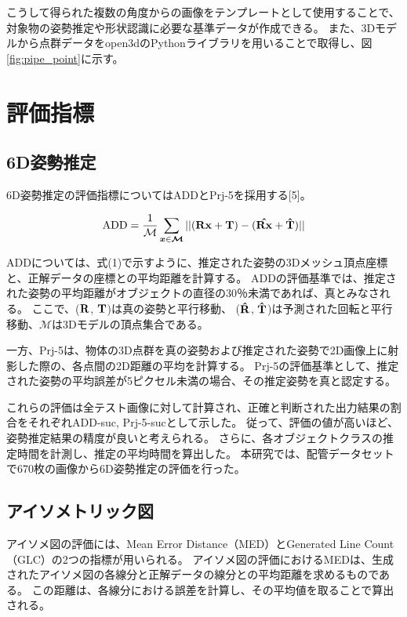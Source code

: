 こうして得られた複数の角度からの画像をテンプレートとして使用することで、対象物の姿勢推定や形状認識に必要な基準データが作成できる。
また、3Dモデルから点群データをopen3dのPythonライブラリを用いることで取得し、図\ref{fig:pipe_point}に示す。

\section{評価指標}
\subsection{6D姿勢推定}
6D姿勢推定の評価指標についてはADDとPrj-5を採用する[5]。

\begin{equation}
\textrm{ADD} = \frac{1}{\mathcal{M}}\sum_{\boldsymbol{x}\in \boldsymbol{\mathcal{M}}}||(\boldsymbol{\textrm{\textbf{Rx}}} + \boldsymbol{\textrm{\textbf{\textbf{T}}}}) - (\boldsymbol{\hat{\textrm{\textbf{Rx}}}} +  \boldsymbol{\hat{\textrm{\textbf{T}}}})||
\end{equation}

ADDについては、式(1)で示すように、推定された姿勢の3Dメッシュ頂点座標と、正解データの座標との平均距離を計算する。
ADDの評価基準では、推定された姿勢の平均距離がオブジェクトの直径の30％未満であれば、真とみなされる。
ここで、($\boldsymbol{\textrm{\textbf{R}}}$, $\boldsymbol{\textrm{\textbf{T}}}$)は真の姿勢と平行移動、 ($\boldsymbol{\hat{\textrm{\textbf{R}}}}$, $\boldsymbol{\hat{\textrm{\textbf{T}}}}$)は予測された回転と平行移動、$\boldsymbol{\mathcal{M}}$は3Dモデルの頂点集合である。

一方、Prj-5は、物体の3D点群を真の姿勢および推定された姿勢で2D画像上に射影した際の、各点間の2D距離の平均を計算する。
Prj-5の評価基準として、推定された姿勢の平均誤差が5ピクセル未満の場合、その推定姿勢を真と認定する。

これらの評価は全テスト画像に対して計算され、正確と判断された出力結果の割合をそれぞれADD-suc, Prj-5-sucとして示した。
従って、評価の値が高いほど、姿勢推定結果の精度が良いと考えられる。
さらに、各オブジェクトクラスの推定時間を計測し、推定の平均時間を算出した。
本研究では、配管データセットで670枚の画像から6D姿勢推定の評価を行った。

\subsection{アイソメトリック図}
アイソメ図の評価には、Mean Error Distance（MED）とGenerated Line Count（GLC）の2つの指標が用いられる。
アイソメ図の評価におけるMEDは、生成されたアイソメ図の各線分と正解データの線分との平均距離を求めるものである。
この距離は、各線分における誤差を計算し、その平均値を取ることで算出される。

